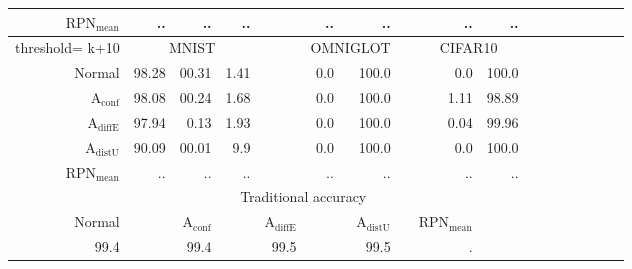 \begin{table}[ht]
\begin{tiny}
\begin{tabular}{@{}rrrrrrrcrrrrcrrrr@{}}
		$\mathrm{RPN}_{\mathrm{mean}}$ & .. & .. & .. & & .. & .. & & .. & .. \\
		\midrule
		threshold= k+10 & \multicolumn{3}{c}{MNIST} & & \multicolumn{2}{c}{OMNIGLOT} & & \multicolumn{2}{c}{CIFAR10} \\
		Normal & 98.28 & 00.31 & 1.41 & & 0.0 & 100.0 && 0.0 & 100.0 \\
		$\mathrm{A}_{\mathrm{conf}}$ & 98.08 & 00.24 & 1.68 && 0.0 & 100.0 && 1.11 & 98.89 \\
		$\mathrm{A}_{\mathrm{diffE}}$ & 97.94 & 0.13 & 1.93 & & 0.0 & 100.0 & & 0.04 & 99.96 \\  
		$\mathrm{A}_{\mathrm{distU}}$ & 90.09 & 00.01 & 9.9 & & 0.0 & 100.0 & & 0.0 & 100.0 \\
		$\mathrm{RPN}_{\mathrm{mean}}$ & .. & .. & .. & & .. & .. & & .. & .. \\
		\midrule
		\toprule
		& \multicolumn{8}{c}{Traditional accuracy} \\
		Normal & & $\mathrm{A}_{\mathrm{conf}}$ & & $\mathrm{A}_{\mathrm{diffE}}$ & & $\mathrm{A}_{\mathrm{distU}}$ & & $\mathrm{RPN}_{\mathrm{mean}}$ \\
		99.4 & & 99.4 & & 99.5 & & 99.5 & & . \\

        \end{tabular}
	\end{tiny}
	\label{tab:precision based data analysis}
\end{table}





